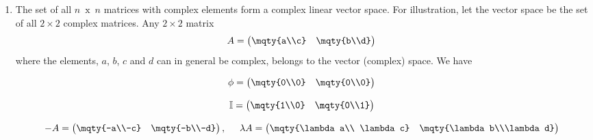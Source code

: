 \begin{enumerate}
{\bf Proof:} Let $f(x)$ and $g(x)$ be two square-integrable functions, i.e.,

$$\int_{-\infty}^{\infty} \abs{f(x)}^2dx < \infty \hspace{5mm} \text{and} \hspace{5mm} 
\int_{-\infty}^{\infty} \abs{g(x)}^2dx < \infty$$.
Then using the inequality
$$\int_{-\infty}^{\infty} \abs{f + g}^2dx \leq \Bigg[\sqrt{\int_{-\infty}^{\infty} \abs{f}^2 dx} + \sqrt{\int_{-\infty}^{\infty} \abs{g}^2 dx}\hspace{1mm}\Bigg]^2$$
it is obvious that 
$$\int_{-\infty}^{\infty} \abs{f+g}^2dx < \infty \hspace{5mm} \text{(i.e., finite).}$$

\item  The set of all $n\, \text{ x }\, n$ matrices with complex elements form a complex linear vector space. For illustration, let 
the vector space be the set of all $2\times 2$ complex matrices. Any $2\times 2$ matrix
$$A=\begin{pmatrix}
\mqty{a\\c} & \mqty{b\\d}
\end{pmatrix}$$
where the elements, $a$, $b$, $c$ and $d$ can in general be complex, belongs to the vector (complex) space. We have

$$\phi =
\begin{pmatrix}
\mqty{0\\0} & \mqty{0\\0}
\end{pmatrix}
$$

$$\mathbb{I} =
\begin{pmatrix}
\mqty{1\\0} & \mqty{0\\1}
\end{pmatrix}
$$




$$-A =
\begin{pmatrix}
\mqty{-a\\-c} & \mqty{-b\\-d}
\end{pmatrix},\hspace{5mm}
\lambda A =
\begin{pmatrix}
\mqty{\lambda a\\ \lambda c} & \mqty{\lambda b\\\lambda d}
\end{pmatrix}
$$

\end{enumerate}






